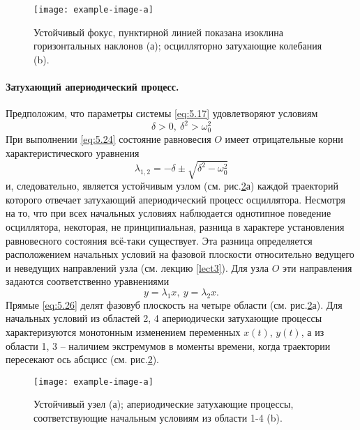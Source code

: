 \begin{figure}[h]
        \centering
        \texttt{[image: example-image-a]}
        \caption{Устойчивый фокус, пунктирной линией показана изоклина горизонтальных наклонов (а); осцилляторно затухающие колебания (b). }
        \label{fig:5.4}
\end{figure}



\paragraph{Затухающий апериодический процесс.}%
\label{par:zatukhaiushchii_aperiodicheskii_protsess_}

Предположим, что параметры системы \eqref{eq:5.17} удовлетворяют условиям
\begin{equation}
        \label{eq:5.24}
        \delta>0,~ \delta^2 > \omega_0^2
\end{equation}
При выполнении \eqref{eq:5.24} состояние равновесия $O$ имеет отрицательные корни характеристического уравнения
\begin{equation}
        \label{eq:5.25}
        \lambda_{1,2} = - \delta \pm \sqrt{ \delta^2 - \omega_0^2}
\end{equation}
и, следовательно, является устойчивым узлом (см. рис.\ref{fig:5.5}а) каждой траекторий которого отвечает затухающий апериодический процесс осциллятора. Несмотря на то, что при всех начальных условиях наблюдается однотипное поведение осциллятора, некоторая, не принципиальная, разница в характере установления равновесного состояния всё-таки существует. Эта разница определяется расположением начальных условий на фазовой плоскости относительно 
ведущего и неведущих направлений узла (см. лекцию \ref{lect3}). Для узла $O$ эти направления задаются соответственно уравнениями
\begin{equation}
        \label{eq:5.26}
        y= \lambda_1 x, ~ y=\lambda_2 x.
\end{equation}
Прямые \eqref{eq:5.26} делят фазовуб плоскость на четыре области (см. рис.\ref{fig:5.5}а). Для начальных условий из областей 2, 4 апериодически затухающие процессы характеризуются монотонным изменением переменных $x(t)$, $y(t)$, а из области 1, 3 -- наличием экстремумов в моменты времени, когда траектории пересекают ось абсцисс (см. рис.\ref{fig:5.5}). 
\begin{figure}[h]
        \centering
        \texttt{[image: example-image-a]}
        \caption{Устойчивый узел (а); апериодические затухающие процессы, соответствующие начальным условиям из области 1-4 (b).}
        \label{fig:5.5}
\end{figure}

